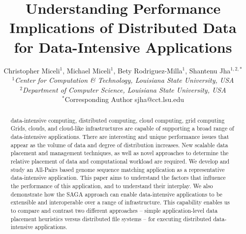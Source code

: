 \documentclass{rspublic}
\title[Understanding Performance Implications of Distributed Data for
Data-Intensive Applications]{Understanding Performance Implications of
Distributed Data for Data-Intensive Applications}
\author[Miceli, Miceli, Rodriguez-Milla, Jha]{ Christopher Miceli$^{1}$,
Michael Miceli$^{1}$, Bety Rodriguez-Milla$^{1}$, Shantenu Jha$^{1,2,*}$ \\
\small{\emph{$^{1}$Center for Computation \& Technology, Louisiana State
University, USA}} \\  \small{\emph{$^{2}$Department of Computer Science,
Louisiana State University, USA}} \\ {\footnotesize {\hspace{0.0 in}
$^*$Corresponding Author sjha@cct.lsu.edu}} }
\begin{document}
 \maketitle

\begin{abstract}{data-intensive computing, distributed computing,
cloud computing, grid computing} 
Grids, clouds, and cloud-like infrastructures are capable of supporting
a broad range of data-intensive applications. There are interesting
and unique performance issues that appear as the volume of data and
degree of distribution increases. New scalable data placement and
management techniques, as well as novel approaches to determine the
relative placement of data and computational workload are required. We
develop and study an All-Pairs based genome sequence matching
application as a representative data-intensive application.  This
paper aims to understand the factors that influence the performance of
this application, and to understand their interplay.  %
We also demonstrate how the SAGA approach can
enable data-intensive applications to be extensible and interoperable
over a range of infrastructure. This capability enables us to compare
and contrast two different approaches -- simple application-level data
placement heuristics versus distributed file systems -- for executing
distributed data-intensive applications.

\end{abstract}
\end{document}
